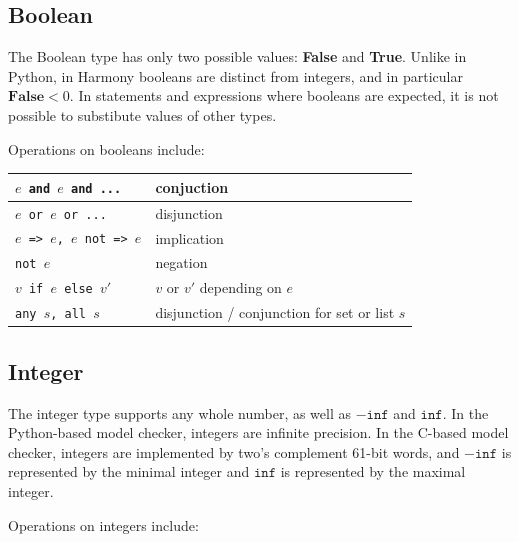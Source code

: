 \documentclass{report}
\begin{document}
\subsection*{Boolean}

The Boolean type has only two possible values: \textbf{False} and
\textbf{True}.  Unlike in Python, in Harmony booleans are distinct
from integers, and in particular $\mathbf{False} < 0$.  In statements
and expressions where booleans are expected, it is not possible to
substibute values of other types.

Operations on booleans include:
\begin{center}
\begin{tabular}{|l|l|}
\hline
\texttt{$e$ and $e$ and ...} & conjuction \\
\hline
\texttt{$e$ or $e$ or ...} & disjunction \\
\hline
\texttt{$e$ => $e$, $e$ not => $e$} & implication \\
\hline
\texttt{not $e$} & negation \\
\hline
\texttt{$v$ if $e$ else $v'$} & $v$ or $v'$ depending on $e$ \\
\hline
\texttt{any $s$, all $s$} & disjunction / conjunction for set or list $s$ \\
\hline
\end{tabular}
\end{center}

\subsection*{Integer}

The integer type supports any whole number, as well as $-\mathtt{inf}$
and $\mathtt{inf}$.  In the Python-based model checker, integers are
infinite precision.  In the C-based model checker, integers are implemented
by two's complement 61-bit words, and $-\mathtt{inf}$ is represented by
the minimal integer and $\mathtt{inf}$ is represented by the maximal integer.

Operations on integers include:
\end{document}
